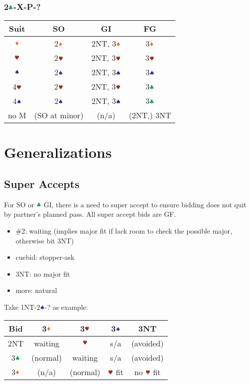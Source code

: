 \documentclass{article}
\newcommand*{\ccc}{\textcolor{ForestGreen}{\clubsuit}}
\newcommand*{\ddd}{\textcolor{Orange}{\vardiamondsuit}}
\newcommand*{\hhh}{\textcolor{Mahogany}{\varheartsuit}}
\newcommand*{\sss}{\textcolor{Blue}{\spadesuit}}
\begin{document}
\begin{multicols}{2}
\subsubsection{2$\ccc$-X-P-?}
\begin{tabular}{c|c|c|c}
    \hline
    Suit & SO & GI & FG \\ \hline\hline
    $\ddd$ & 2$\ddd$ & 2NT, 3$\ddd$ & 3$\ddd$ \\ \hline
    $\hhh$ & 2$\hhh$ & 2NT, 3$\hhh$ & 3$\hhh$ \\ \hline
    $\sss$ & 2$\sss$ & 2NT, 3$\sss$ & 3$\sss$ \\ \hline
    4$\hhh$ & 2$\hhh$ & 2NT, 3$\hhh$ & 3$\ccc$ \\ \hline
    4$\sss$ & 2$\sss$ & 2NT, 3$\sss$ & 3$\ccc$ \\ \hline
    no M & (SO at minor) & (n/a) & (2NT,) 3NT \\ \hline
\end{tabular}

\section{Generalizations}
\subsection{Super Accepts}
For SO or $\ccc$ GI, there is a need to super accept to ensure bidding does not quit by partner's planned pass. All super accept bids are GF.
\begin{itemize}
    \setlength\itemsep{-0.2em}
    \item \#2: waiting (implies major fit if lack room to check the possible major, otherwise bit 3NT)
    \item cuebid: stopper-ask
    \item 3NT: no major fit
    \item more: natural
\end{itemize}

\noindent Take 1NT-2$\sss$-? as example: \\
\begin{tabular}{c|c|c|c|c}
    \hline
    Bid & 3$\ddd$ & 3$\hhh$ & 3$\sss$ & 3NT \\ \hline\hline
    2NT & waiting & $\hhh$ & s/a & (avoided) \\ \hline
    3$\ccc$ & (normal) & waiting & s/a & (avoided) \\ \hline
    3$\ddd$ & (n/a) & (normal) & $\hhh$ fit & no $\hhh$ fit \\ \hline
\end{tabular}


\end{multicols}
\end{document}
